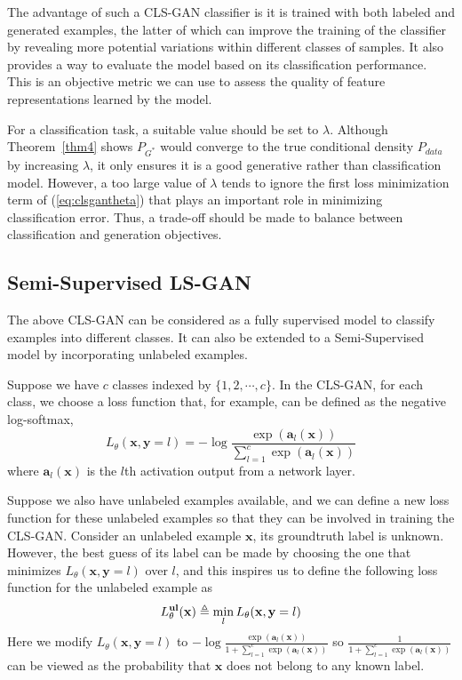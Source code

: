 \documentclass[11pt,fullpage, letterpaper,twoside]{article}
\newcommand{\1}[1]{\mathds{1}_{\left[#1\right]}}
\begin{document}
The advantage of such a CLS-GAN classifier is it is trained with both labeled and generated examples, the latter of which can improve the training of the classifier by revealing more potential variations within different classes of samples. It also provides a way to evaluate the model based on its classification performance. This is an objective metric we can use to assess the quality of feature representations learned by the model.

For a classification task, a suitable value should be set to $\lambda$.  Although Theorem~\ref{thm4} shows $P_{G^*}$ would converge to the true conditional density $P_{data}$ by increasing $\lambda$, it only ensures it is a good generative rather than classification model.  However, a too large value of $\lambda$ tends to ignore the first loss minimization term of (\ref{eq:clsgantheta}) that plays an important role in minimizing classification error.  Thus, a trade-off should be made to balance between classification and generation objectives.



\subsection{Semi-Supervised LS-GAN}\label{sec:ssl}
The above CLS-GAN can be considered as a fully supervised model to classify examples into different classes.
It can also be extended to a Semi-Supervised model by incorporating unlabeled examples.

Suppose we have $c$ classes indexed by $\{1,2,\cdots,c\}$. In the CLS-GAN, for each class, we choose a loss function that, for example, can be defined as the negative log-softmax,
$$
L_\theta(\mathbf x, \mathbf y=l) = -\log\dfrac{\exp(\mathbf a_l(\mathbf x))}{\sum_{l=1}^c \exp(\mathbf a_l(\mathbf x))}
$$
where $\mathbf a_l(\mathbf x)$ is the $l$th activation output from a network layer.

Suppose we also have unlabeled examples available, and we can define a new loss function for these unlabeled examples so that they can be involved in training the CLS-GAN. Consider an unlabeled example $\mathbf x$, its groundtruth label is unknown.  However, the best guess of its label can be made by choosing the one that minimizes $L_\theta(\mathbf x, \mathbf y=l)$ over $l$, and this inspires us to define the following loss function for the unlabeled example as
$$
L_\theta^{\bf ul}(\mathbf x)\triangleq\min_l L_\theta(\mathbf x, \mathbf y=l)
$$
Here we modify $L_\theta(\mathbf x, \mathbf y=l)$ to $-\log\frac{\exp(\mathbf a_l(\mathbf x))}{1+\sum_{l=1}^c \exp(\mathbf a_l(\mathbf x))}$ so $\frac{1}{1+\sum_{l=1}^c \exp(\mathbf a_l(\mathbf x))}$ can be viewed as the probability that $\mathbf x$ does not belong to any known label.
\end{document}
